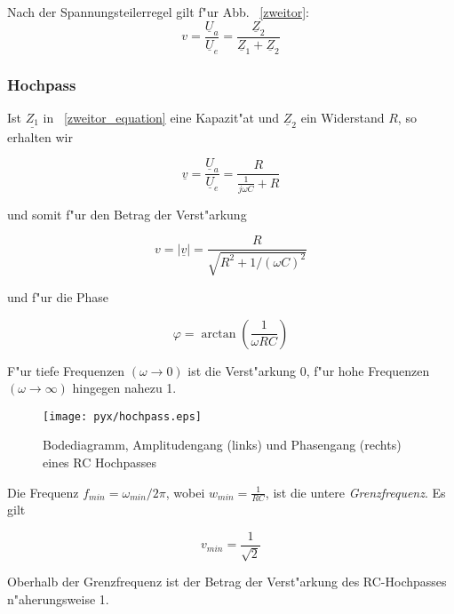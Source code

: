 \documentclass[german, 10pt, a4paper, headsepline]{scrreprt}
\theoremstyle{remark}
\begin{document}
Nach der Spannungsteilerregel gilt f"ur Abb. ~\ref{zweitor}:
\begin{equation}
	v = \frac{\underline{U}_a}{\underline{U}_e} = \frac{\underline{Z}_2}{\underline{Z}_1+\underline{Z}_2}
	\label{zweitor_equation}
\end{equation}

\subsubsection{Hochpass}

Ist $\underline{Z_1}$ in ~\ref{zweitor_equation} eine Kapazit"at und $\underline{Z}_2$ ein Widerstand $R$, so erhalten wir

\begin{displaymath}
	\underline{v} = \frac{\underline{U}_a}{\underline{U}_e} = \frac{R}{\frac{1}{j\omega C}+R}
\end{displaymath}

und somit f"ur den Betrag der Verst"arkung

\begin{displaymath}
	v = |\underline{v}|=\frac{R}{\sqrt{R^2+1/(\omega C)^2}}
\end{displaymath}

und f"ur die Phase

\begin{displaymath}
	\varphi = \arctan \left( \frac{1}{\omega RC} \right)
\end{displaymath}

F"ur tiefe Frequenzen $(\omega \to 0)$ ist die Verst"arkung 0, f"ur hohe Frequenzen $(\omega \to \infty)$ hingegen nahezu 1.

\begin{figure}[hbt]
 \begin{center}
 	\texttt{[image: pyx/hochpass.eps]}
 \end{center}
 \caption{Bodediagramm, Amplitudengang (links) und Phasengang (rechts) eines RC Hochpasses}
 \label{hochpass}
\end{figure}

Die Frequenz $f_{min}=\omega_{min}/2\pi$,  wobei $w_{min}= \frac{1}{RC}$, ist die untere \textit{Grenzfrequenz}. Es gilt

\begin{displaymath}
	v_{min} = \frac{1}{\sqrt{2}}
\end{displaymath}

Oberhalb der Grenzfrequenz ist der Betrag der Verst"arkung des RC-Hochpasses n"aherungsweise 1.\\
\end{document}
